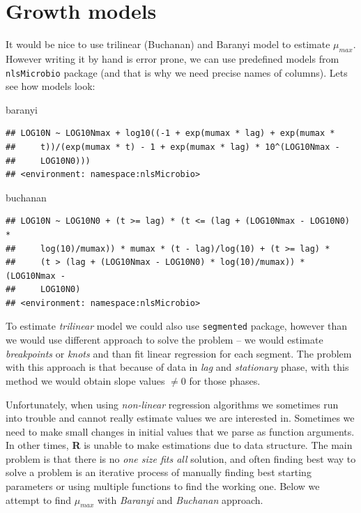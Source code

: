 \documentclass[]{book}
\newenvironment{Shaded}{\begin{snugshade}}{\end{snugshade}}
\newcommand{\NormalTok}[1]{#1}
\theoremstyle{definition}
\theoremstyle{definition}
\theoremstyle{definition}
\theoremstyle{remark}
\begin{document}
\section{Growth models}\label{growth-models}

It would be nice to use trilinear (Buchanan) and Baranyi model to
estimate \(\mu_{max}\). However writing it by hand is error prone, we
can use predefined models from \texttt{nlsMicrobio} package (and that is
why we need precise names of columns). Lets see how models look:

\begin{Shaded}
\begin{Highlighting}[]
\NormalTok{baranyi}
\end{Highlighting}
\end{Shaded}

\begin{verbatim}
## LOG10N ~ LOG10Nmax + log10((-1 + exp(mumax * lag) + exp(mumax * 
##     t))/(exp(mumax * t) - 1 + exp(mumax * lag) * 10^(LOG10Nmax - 
##     LOG10N0)))
## <environment: namespace:nlsMicrobio>
\end{verbatim}

\begin{Shaded}
\begin{Highlighting}[]
\NormalTok{buchanan}
\end{Highlighting}
\end{Shaded}

\begin{verbatim}
## LOG10N ~ LOG10N0 + (t >= lag) * (t <= (lag + (LOG10Nmax - LOG10N0) * 
##     log(10)/mumax)) * mumax * (t - lag)/log(10) + (t >= lag) * 
##     (t > (lag + (LOG10Nmax - LOG10N0) * log(10)/mumax)) * (LOG10Nmax - 
##     LOG10N0)
## <environment: namespace:nlsMicrobio>
\end{verbatim}

To estimate \emph{trilinear} model we could also use \texttt{segmented}
package, however than we would use different approach to solve the
problem -- we would estimate \emph{breakpoints} or \emph{knots} and than
fit linear regression for each segment. The problem with this approach
is that because of data in \emph{lag} and \emph{stationary} phase, with
this method we would obtain slope values \(\neq 0\) for those phases.

Unfortunately, when using \emph{non-linear} regression algorithms we
sometimes run into trouble and cannot really estimate values we are
interested in. Sometimes we need to make small changes in initial values
that we parse as function arguments. In other times, \textbf{R} is
unable to make estimations due to data structure. The main problem is
that there is no \emph{one size fits all} solution, and often finding
best way to solve a problem is an iterative process of manually finding
best starting parameters or using multiple functions to find the working
one. Below we attempt to find \(\mu_{max}\) with \emph{Baranyi} and
\emph{Buchanan} approach.
\end{document}
